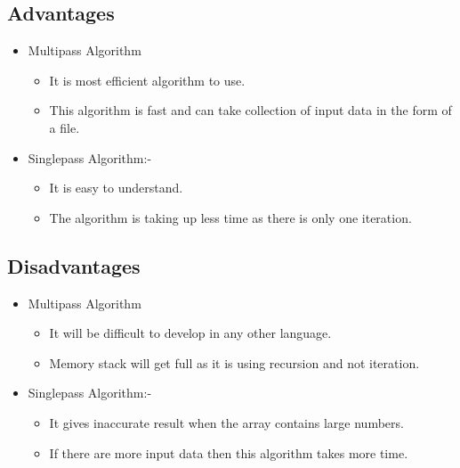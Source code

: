 \documentclass[11pt]{report}
\begin{document}
\subsection{\Large \vspace{0.2 cm}Advantages}
\begin{itemize}
\item Multipass Algorithm 
\begin{itemize}
    \item It is most efficient algorithm to use.
    \item This algorithm is fast and can take collection of input data in the form of a file.
\end{itemize}

\item Singlepass Algorithm:-
\begin{itemize}
\item It is easy to understand.
\item The algorithm is taking up less time as there is only one iteration.
\end{itemize}
\end{itemize}

\subsection{\Large \vspace{0.2 cm}Disadvantages}
\begin{itemize}
\item Multipass Algorithm 

\begin{itemize}
    \item It will be difficult to develop in any other language.
    \item Memory stack will get full as it is using recursion and not iteration.
\end{itemize}

\item Singlepass Algorithm:-
\begin{itemize}
\item It gives inaccurate result when the array contains large numbers.
\item If there are more input data then this algorithm takes more time.
\end{itemize}
\end{itemize}
\end{document}
